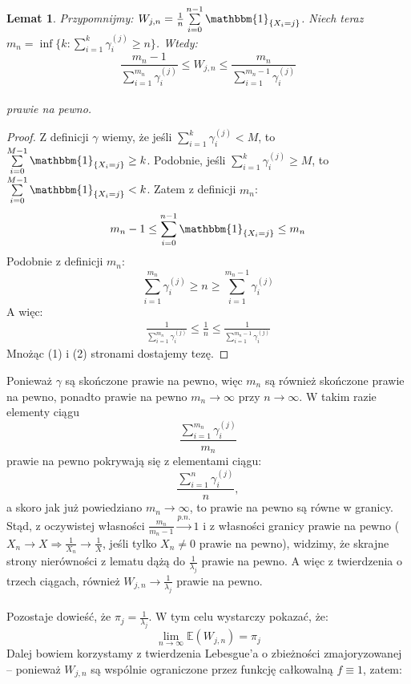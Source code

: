 \documentclass[a4paper]{article}
\theoremstyle{defn}
\theoremstyle{theorem}
\theoremstyle{lemma}
\newtheorem{lemma}[defn]{Lemat}
\theoremstyle{cor}
\theoremstyle{fact}
\begin{document}
\begin{lemma}\label{lemma2.5.12}
Przypomnijmy: $W_{j, n} = \frac{1}{n}\sum\limits_{i = 0}^{n-1} \mathbbm{1}_{\{X_i = j\}}$. Niech teraz $m_n = \inf \{k: \sum\limits_{i=1}^k \gamma_i^{(j)} \geq n\}$. Wtedy:
$$ \frac{m_n - 1}{\sum\limits_{i=1}^{m_n} \gamma_i^{(j)}} \leq W_{j, n}  \leq \frac{m_n}{\sum\limits_{i=1}^{m_n-1} \gamma_i^{(j)}}$$\\
prawie na pewno.
\end{lemma}
\begin{proof}
Z definicji $\gamma$ wiemy, że jeśli $\sum\limits_{i=1}^k \gamma_i^{(j)} < M$, to $\sum\limits_{i = 0}^{M-1} \mathbbm{1}_{\{X_i = j\}} \geq k$. Podobnie, jeśli $\sum\limits_{i=1}^k \gamma_i^{(j)} \geq M$, to $\sum\limits_{i = 0}^{M-1} \mathbbm{1}_{\{X_i = j\}} < k$. Zatem z definicji $m_n$:
\begin{align}
m_n - 1 \leq \sum\limits_{i = 0}^{n-1} \mathbbm{1}_{\{X_i = j\}} \leq m_n
\end{align}
Podobnie z definicji $m_n$:
$$\sum\limits_{i=1}^{m_n} \gamma_i^{(j)} \geq n \geq \sum\limits_{i=1}^{m_n - 1} \gamma_i^{(j)}$$
A więc:
\begin{align}
     \frac{1}{\sum\limits_{i=1}^{m_n} \gamma_i^{(j)}} \leq \frac{1}{n} \leq \frac{1}{\sum\limits_{i=1}^{m_n - 1} \gamma_i^{(j)}}
\end{align}
Mnożąc (1) i (2) stronami dostajemy tezę.
\end{proof}
Ponieważ $\gamma$ są skończone prawie na pewno, więc $m_n$ są również skończone prawie na pewno, ponadto prawie na pewno $m_n \to \infty$ przy $n \to \infty$. W takim razie elementy ciągu
$$\frac{\sum\limits_{i=1}^{m_n} \gamma_i^{(j)}}{m_n}$$
prawie na pewno pokrywają się z elementami ciągu:
$$\frac{\sum\limits_{i=1}^{n} \gamma_i^{(j)}}{n},$$
a skoro jak już powiedziano $m_n \to \infty$, to prawie na pewno są równe w granicy.
Stąd, z oczywistej własności $\frac{m_n}{m_n-1} \overset{p.n.}{\to} 1$ i z własności granicy prawie na pewno ($ X_n \to X \Rightarrow \frac{1}{X_n} \to \frac{1}{X}$, jeśli tylko $X_n \neq 0$ prawie na pewno), widzimy, że skrajne strony nierówności z lematu dążą do $\frac{1}{\lambda_j}$ prawie na pewno. A więc z twierdzenia o trzech ciągach, również $W_{j,n} \to \frac{1}{\lambda_j}$ prawie na pewno.\\
\\
Pozostaje dowieść, że $\pi_j = \frac{1}{\lambda_j}$. W tym celu wystarczy pokazać, że:
$$ \lim\limits_{n \to \infty} \mathbb{E}(W_{j,n}) = \pi_j$$ Dalej bowiem korzystamy z twierdzenia Lebesgue'a o zbieżności zmajoryzowanej – ponieważ $W_{j,n}$ są wspólnie ograniczone przez funkcję całkowalną $f \equiv 1$, zatem:
\end{document}
